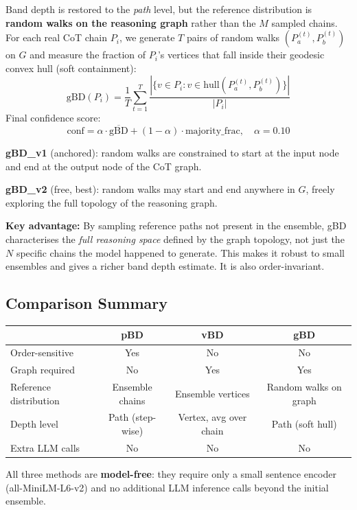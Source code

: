 Band depth is restored to the \emph{path} level, but the reference distribution
is \textbf{random walks on the reasoning graph} rather than the $M$ sampled chains.
For each real CoT chain $P_i$, we generate $T$ pairs of random walks
$(P_a^{(t)}, P_b^{(t)})$ on $G$ and measure the fraction of $P_i$'s vertices
that fall inside their geodesic convex hull (soft containment):
\[
\text{gBD}(P_i) = \frac{1}{T} \sum_{t=1}^{T}
\frac{|\{v \in P_i : v \in \text{hull}(P_a^{(t)}, P_b^{(t)})\}|}{|P_i|}
\]
Final confidence score:
\[
\text{conf} = \alpha \cdot \overline{\text{gBD}} + (1-\alpha) \cdot \text{majority\_frac},
\quad \alpha = 0.10
\]

\textbf{gBD\_v1} (anchored): random walks are constrained to start at the
input node and end at the output node of the CoT graph.

\textbf{gBD\_v2} (free, best): random walks may start and end anywhere in $G$,
freely exploring the full topology of the reasoning graph.

\textbf{Key advantage:} By sampling reference paths not present in the ensemble,
gBD characterises the \emph{full reasoning space} defined by the graph topology,
not just the $N$ specific chains the model happened to generate. This makes it
robust to small ensembles and gives a richer band depth estimate. It is also
order-invariant.

\subsection*{Comparison Summary}

\begin{tabular}{lccc}
\hline
& \textbf{pBD} & \textbf{vBD} & \textbf{gBD} \\
\hline
Order-sensitive & Yes & No & No \\
Graph required  & No  & Yes & Yes \\
Reference distribution & Ensemble chains & Ensemble vertices & Random walks on graph \\
Depth level     & Path (step-wise) & Vertex, avg over chain & Path (soft hull) \\
Extra LLM calls & No  & No  & No \\
\hline
\end{tabular}

All three methods are \textbf{model-free}: they require only a small sentence encoder
(all-MiniLM-L6-v2) and no additional LLM inference calls beyond the initial ensemble.
